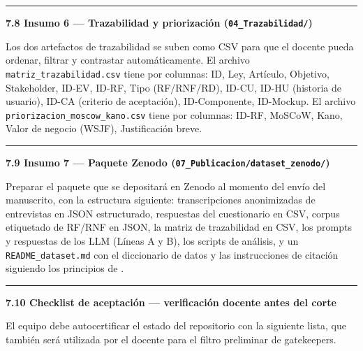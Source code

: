 \documentclass[11pt,a4paper]{article}
\newcommand{\submark}[1]{\par\vspace{4pt}\noindent
    {\color{uteqgreen}\rule[-1pt]{3.5pt}{12pt}}\hspace{6pt}\textbf{\color{uteqgreen}#1}\par\vspace{2pt}}
\begin{document}
\submark{7.8 Insumo 6 --- Trazabilidad y priorización (\texttt{04\_Trazabilidad/})}
Los dos artefactos de trazabilidad se suben como CSV para que el docente pueda ordenar, filtrar y contrastar automáticamente.
El archivo \texttt{matriz\_trazabilidad.csv} tiene por columnas: ID, Ley, Artículo, Objetivo, Stakeholder, ID-EV, ID-RF, Tipo (RF/RNF/RD), ID-CU, ID-HU (historia de usuario), ID-CA (criterio de aceptación), ID-Componente, ID-Mockup.
El archivo \texttt{priorizacion\_moscow\_kano.csv} tiene por columnas: ID-RF, MoSCoW, Kano, Valor de negocio (WSJF), Justificación breve.

\submark{7.9 Insumo 7 --- Paquete Zenodo (\texttt{07\_Publicacion/dataset\_zenodo/})}
Preparar el paquete que se depositará en Zenodo al momento del envío del manuscrito, con la estructura siguiente: transcripciones anonimizadas de entrevistas en JSON estructurado, respuestas del cuestionario en CSV, corpus etiquetado de RF/RNF en JSON, la matriz de trazabilidad en CSV, los prompts y respuestas de los LLM (Líneas A y B), los scripts de análisis, y un \texttt{README\_dataset.md} con el diccionario de datos y las instrucciones de citación siguiendo los principios de \cite{smith2016force11}.

\submark{7.10 Checklist de aceptación --- verificación docente antes del corte}
El equipo debe autocertificar el estado del repositorio con la siguiente lista, que también será utilizada por el docente para el filtro preliminar de gatekeepers.
\end{document}
